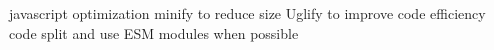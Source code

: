 javascript optimization 
  minify to reduce size 
  Uglify  to improve code efficiency 
  code split and use ESM modules when possible